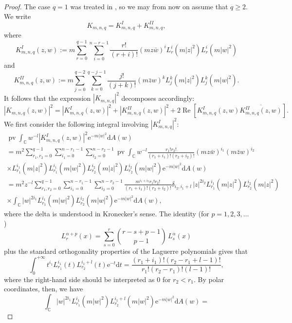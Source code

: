 \documentclass{birkart}
\theoremstyle{definition}
\theoremstyle{remark}
\numberwithin{equation}{section}
\numberwithin{figure}{section}
\newcommand{\e}{\mathrm e}
\newcommand{\1}{{\mathbf 1}}
\newcommand{\Rpar}{q}
\newcommand{\C}{{\mathbb C}}
\newcommand{\re}{\operatorname{Re}}
\newcommand{\diff}{{\mathrm d}}
\newcommand{\pv}{\operatorname{\mathrm{pv}}}
\begin{document}
\begin{proof}
The case $\Rpar=1$ was treated in \cite{ahm1}, so we may from now on assume 
that $\Rpar\ge2$. We write
\[K_{m,n,\Rpar}=K_{m,n,\Rpar}^I+K_{m,n,\Rpar}^{II},
\]
where
\[
K_{m,n,\Rpar}^I(z,w):=m\sum_{r=0}^{\Rpar-1}\sum_{i=0}^{n-r-1} 
\frac{r!}{(r+i)!}(mz \bar{w})^i L_r^{i}(m|z|^2)L_r^{i}(m|w|^2)
\]
and
\[
K_{m,n,\Rpar}^{II}(z,w):=
m\sum_{j=0}^{\Rpar-2} \sum_{k=0}^{\Rpar-j-1} \frac{j!}{(j+k)!} 
(m\bar{z}w)^k L^{k}_{j}(m|z|^2)L^{k}_{j}(m|w|^2). 
\]
It follows that the expression $|K_{m,n,\Rpar}|^2$ decomposes accordingly:
\begin{equation}
|K_{m,n,\Rpar}(z,w)|^2
=|K_{m,n,\Rpar}^I(z,w)|^2+|K_{m,n,\Rpar}^{II}(z,w)|^2
+2\re[ K_{m,n,\Rpar}^I(z,w)\overline{K_{m,n,\Rpar}^{II}(z,w)}].
\label{eq-decomp}
\end{equation}
We first consider the following integral involving $|K_{m,n,\Rpar}^I|^2$:
\begin{multline}
\pv \int_{\mathbb{C}} w^{-l} 
|K^I_{m,n,\Rpar}(z,w)|^2\e^{-m|w|^2} \diff A(w) 
\label{extpoint-rivi5} 
\\
=m^2 \sum_{r_1,r_2=0}^{\Rpar-1}\sum_{i_1=0}^{n-r_1-1} \sum_{i_2=0}^{n-r_2-1}
\pv \int_{\C} w^{-l} 
\frac{r_1!r_2!}{(r_1+i_1)!(r_2+i_2)!}(mz\bar{w})^{i_1}(m\bar{z}w)^{i_2}
\\
\times L_{r_1}^{i_1}(m|z|^2)L^{i_1}_{r_1}(m|w|^2)L^{i_2}_{r_2}(m|z|^2)
L^{i_2}_{r_2}(m|w|^2) \e^{-m|w|^2}\diff A(w)
\\
=m^2 z^{-l}
\sum_{r_1,r_2=0}^{\Rpar-1}\sum_{i_1=0}^{n-r_1-1}\sum_{i_2=0}^{n-r_2-1}
\frac{m^{i_1+i_2}r_1!r_2!}{(r_1+i_1)!(r_2+i_2)!}\delta_{i_2,i_1+l}\,|z|^{2i_2}
L_{r_1}^{i_1}(m|z|^2)L^{i_2}_{r_2}(m|z|^2)
\\
\times\int_{\C} |w|^{2i_1} L^{i_1}_{r_1}(m|w|^2)
L^{i_2}_{r_2}(m|w|^2) \e^{-m|w|^2}\diff A(w),
\end{multline}
where the delta is understood in Kronecker's sense.
The identity (for $p=1,2,3,\ldots$)
\begin{equation} 
\label{recurrencerelation}
L^{\alpha+p}_r(x)= \sum_{s=0}^r \binom{r-s+p-1}{p-1}\,
L_{s}^{\alpha}(x)
\end{equation}
plus the standard orthogonality properties of the Laguerre polynomials 
gives that
\[
\int_0^{+\infty}t^{i_1}L_{r_1}^{i_1}(t)L_{r_2}^{i_1+l}(t)\e^{-t}\diff t=
\frac{(r_1+i_1)!(r_2-r_1+l-1)!}{r_1!(r_2-r_1)!(l-1)!},
\]
where the right-hand side should be interpreted as $0$ for $r_2<r_1$. By
polar coordinates, then, we have
\[
\int_\C |w|^{2i_1}L_{r_1}^{i_1}(m|w|^2)L_{r_2}^{i_1+l}(m|w|^2)\e^{-m|w|^2}
\diff A(w)=
\]
\end{proof}
\end{document}
